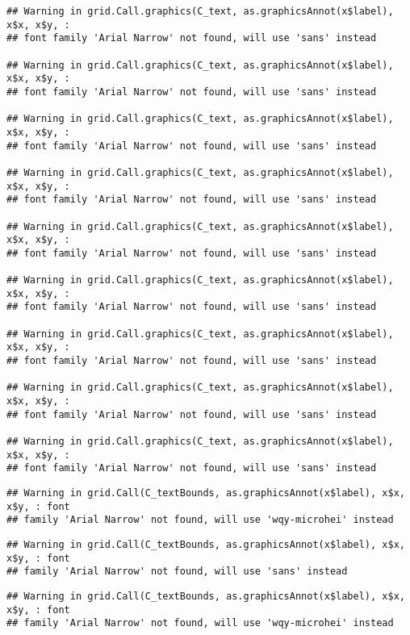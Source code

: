 \documentclass[
]{article}
\begin{document}
\begin{verbatim}
## Warning in grid.Call.graphics(C_text, as.graphicsAnnot(x$label), x$x, x$y, :
## font family 'Arial Narrow' not found, will use 'sans' instead

## Warning in grid.Call.graphics(C_text, as.graphicsAnnot(x$label), x$x, x$y, :
## font family 'Arial Narrow' not found, will use 'sans' instead

## Warning in grid.Call.graphics(C_text, as.graphicsAnnot(x$label), x$x, x$y, :
## font family 'Arial Narrow' not found, will use 'sans' instead

## Warning in grid.Call.graphics(C_text, as.graphicsAnnot(x$label), x$x, x$y, :
## font family 'Arial Narrow' not found, will use 'sans' instead

## Warning in grid.Call.graphics(C_text, as.graphicsAnnot(x$label), x$x, x$y, :
## font family 'Arial Narrow' not found, will use 'sans' instead

## Warning in grid.Call.graphics(C_text, as.graphicsAnnot(x$label), x$x, x$y, :
## font family 'Arial Narrow' not found, will use 'sans' instead

## Warning in grid.Call.graphics(C_text, as.graphicsAnnot(x$label), x$x, x$y, :
## font family 'Arial Narrow' not found, will use 'sans' instead

## Warning in grid.Call.graphics(C_text, as.graphicsAnnot(x$label), x$x, x$y, :
## font family 'Arial Narrow' not found, will use 'sans' instead

## Warning in grid.Call.graphics(C_text, as.graphicsAnnot(x$label), x$x, x$y, :
## font family 'Arial Narrow' not found, will use 'sans' instead
\end{verbatim}

\begin{verbatim}
## Warning in grid.Call(C_textBounds, as.graphicsAnnot(x$label), x$x, x$y, : font
## family 'Arial Narrow' not found, will use 'wqy-microhei' instead
\end{verbatim}

\begin{verbatim}
## Warning in grid.Call(C_textBounds, as.graphicsAnnot(x$label), x$x, x$y, : font
## family 'Arial Narrow' not found, will use 'sans' instead
\end{verbatim}

\begin{verbatim}
## Warning in grid.Call(C_textBounds, as.graphicsAnnot(x$label), x$x, x$y, : font
## family 'Arial Narrow' not found, will use 'wqy-microhei' instead
\end{verbatim}
\end{document}
